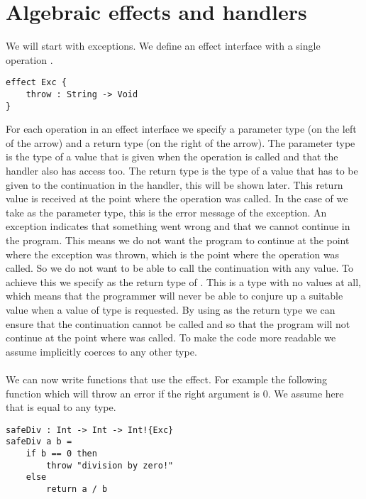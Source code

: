 \section{Algebraic effects and handlers}
\label{sec:background-algeff}
We will start with exceptions. We define an  effect interface with a single operation .

\begin{verbatim}
effect Exc {
	throw : String -> Void
}
\end{verbatim}

For each operation in an effect interface we specify a parameter type (on the left of the arrow) and a return type (on the right of the arrow).
The parameter type is the type of a value that is given when the operation is called and that the handler also has access too.
The return type is the type of a value that has to be given to the continuation in the handler, this will be shown later.
This return value is received at the point where the operation was called.
In the case of  we take  as the parameter type, this is the error message of the exception.
An exception indicates that something went wrong and that we cannot continue in the program.
This means we do not want the program to continue at the point where the exception was thrown, which is the point where the  operation was called.
So we do not want to be able to call the continuation with any value.
To achieve this we specify  as the return type of .
This is a type with no values at all, which means that the programmer will never be able to conjure up a suitable value when a value of type  is requested. By using  as the return type we can ensure that the continuation cannot be called and so that the program will not continue at the point where  was called. To make the code more readable we assume  implicitly coerces to any other type.
\\\\
We can now write functions that use the  effect.
For example the following function  which will throw an error if the right argument is $0$.
We assume here that  is equal to any type.

\begin{verbatim}
safeDiv : Int -> Int -> Int!{Exc}
safeDiv a b =
	if b == 0 then
		throw "division by zero!"
	else
		return a / b
\end{verbatim}

